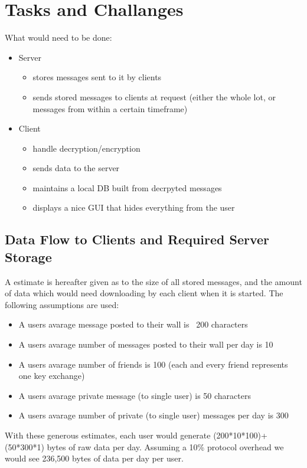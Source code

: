 \chapter{Tasks and Challanges}
What would need to be done:
\begin{itemize}
\item  Server
    \begin{itemize}
    \item stores messages sent to it by clients
    \item sends stored messages to clients at request (either the whole lot, or
    messages from within a certain timeframe)
    \end{itemize}
\item Client
    \begin{itemize}
    \item handle decryption/encryption
    \item sends data to the server
    \item maintains a local DB built from decrpyted messages
    \item displays a nice GUI that hides everything from the user
    \end{itemize}
\end{itemize}

\section{Data Flow to Clients and Required Server Storage}
A estimate is hereafter given as to the size of all stored messages, and the
amount of data which would need downloading by each client when it is started.
The following assumptions are used:
\begin{itemize}
\item A users avarage message posted to their wall is ~200 characters
\item A users avarage number of messages posted to their wall per day is 10
\item A users avarage number of friends is 100 (each and every friend represents
one key exchange)
\item A users avarage private message (to single user) is 50 characters
\item A users avarage number of private (to single user) messages per day is 300
\end{itemize}
With these generous estimates, each user would generate (200*10*100)+(50*300*1)
bytes of raw data per day. Assuming a 10\% protocol overhead we would see
236,500 bytes of data per day per user.\\


